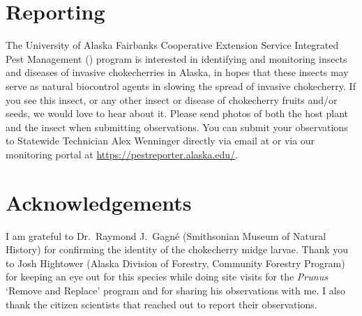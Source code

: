 \section{Reporting}
 The University of Alaska Fairbanks Cooperative Extension Service Integrated Pest Management () program is interested in identifying and monitoring insects and diseases of invasive chokecherries in Alaska, in hopes that these insects may serve as natural biocontrol agents in slowing the spread of invasive chokecherry. If you see this insect, or any other insect or disease of chokecherry fruits and/or seeds, we would love to hear about it. Please send photos of both the host plant and the insect when submitting observations. You can submit your observations to Statewide  Technician Alex Wenninger directly via email at  or via our monitoring portal at \url{https://pestreporter.alaska.edu/}.  
 
\section{Acknowledgements}
I am grateful to Dr.\ Raymond J.\ Gagn\'{e} (Smithsonian Museum of Natural History) for confirming the identity of the chokecherry midge larvae. Thank you to Josh Hightower (Alaska  Division of Forestry, Community Forestry Program) for keeping an eye out for this species while doing site visits for the \textit{Prunus} `Remove and Replace' program and for sharing his observations with me. I also thank the citizen scientists that reached out to report their observations. 


